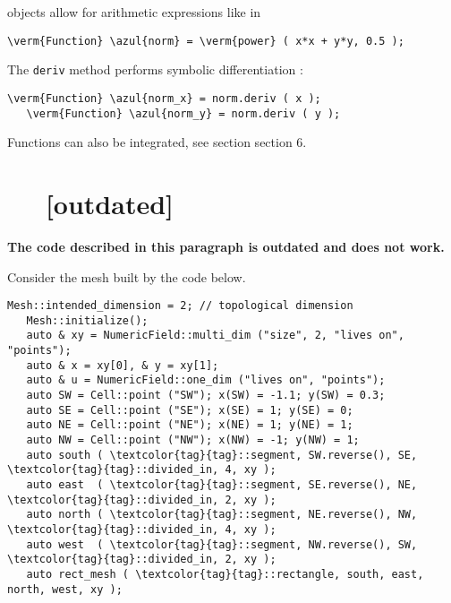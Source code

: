 {\small\tt {}} objects allow for arithmetic expressions like in

\begin{Verbatim}[commandchars=\\\{\},formatcom=\small\tt,
   baselinestretch=0.94,framesep=2mm                     ]
   \verm{Function} \azul{norm} = \verm{power} ( x*x + y*y, 0.5 );
\end{Verbatim}

The {\small\tt deriv} method performs symbolic differentiation :

\begin{Verbatim}[commandchars=\\\{\},formatcom=\small\tt,
   baselinestretch=0.94,framesep=2mm                     ]
   \verm{Function} \azul{norm_x} = norm.deriv ( x );
   \verm{Function} \azul{norm_y} = norm.deriv ( y );
\end{Verbatim}

Functions can also be integrated, see section \numb section 6.


\section{~~ [outdated]}\label{\numb section 5.\numb parag 2}

{\normalfont\bfseries The code described in this paragraph is outdated and does not work.}

Consider the mesh built by the code below.

\begin{Verbatim}[commandchars=\\\{\},formatcom=\small\tt,
   baselinestretch=0.94,framesep=2mm                     ]
   Mesh::intended_dimension = 2; // topological dimension
   Mesh::initialize();
   auto & xy = NumericField::multi_dim ("size", 2, "lives on", "points");	
   auto & x = xy[0], & y = xy[1];
   auto & u = NumericField::one_dim ("lives on", "points");
   auto SW = Cell::point ("SW"); x(SW) = -1.1; y(SW) = 0.3;
   auto SE = Cell::point ("SE"); x(SE) = 1; y(SE) = 0;
   auto NE = Cell::point ("NE"); x(NE) = 1; y(NE) = 1;
   auto NW = Cell::point ("NW"); x(NW) = -1; y(NW) = 1;
   auto south ( \textcolor{tag}{tag}::segment, SW.reverse(), SE, \textcolor{tag}{tag}::divided_in, 4, xy );
   auto east  ( \textcolor{tag}{tag}::segment, SE.reverse(), NE, \textcolor{tag}{tag}::divided_in, 2, xy );
   auto north ( \textcolor{tag}{tag}::segment, NE.reverse(), NW, \textcolor{tag}{tag}::divided_in, 4, xy );
   auto west  ( \textcolor{tag}{tag}::segment, NW.reverse(), SW, \textcolor{tag}{tag}::divided_in, 2, xy );
   auto rect_mesh ( \textcolor{tag}{tag}::rectangle, south, east, north, west, xy );
\end{Verbatim}

